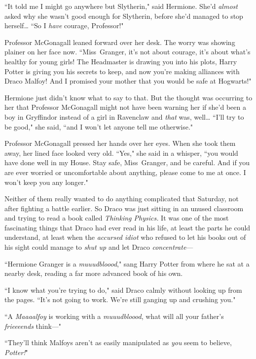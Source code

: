 ``It told me I might go anywhere but Slytherin," said Hermione. She'd \emph{almost} asked why she wasn't good enough for Slytherin, before she'd managed to stop herself{\ldots} ``So I \emph{have} courage, Professor!"

Professor McGonagall leaned forward over her desk. The worry was showing plainer on her face now. ``Miss~Granger, it's not about courage, it's about what's healthy for young girls! The Headmaster is drawing you into his plots, Harry Potter is giving you his secrets to keep, and now you're making alliances with Draco Malfoy! And I promised your mother that you would be safe at Hogwarts!"

Hermione just didn't know what to say to that. But the thought was occurring to her that Professor McGonagall might not have been warning her if she'd been a boy in Gryffindor instead of a girl in Ravenclaw and \emph{that} was, well{\ldots} ``I'll try to be good," she said, ``and I won't let anyone tell me otherwise."

Professor McGonagall pressed her hands over her eyes. When she took them away, her lined face looked very old. ``Yes," she said in a whisper, ``you would have done well in my House. Stay safe, Miss~Granger, and be careful. And if you are ever worried or uncomfortable about anything, please come to me at once. I won't keep you any longer."


Neither of them really wanted to do anything complicated that Saturday, not after fighting a battle earlier. So Draco was just sitting in an unused classroom and trying to read a book called \emph{Thinking Physics.} It was one of the most fascinating things that Draco had ever read in his life, at least the parts he could understand, at least when the \emph{accursed idiot} who refused to let his books out of his sight could manage to \emph{shut up} and let Draco \emph{concentrate}—

``Hermione Granger is a \emph{muuudbloood}," sang Harry Potter from where he sat at a nearby desk, reading a far more advanced book of his own.

``I know what you're trying to do," said Draco calmly without looking up from the pages. ``It's not going to work. We're still ganging up and crushing you."

``A \emph{Maaaalfoy} is working with a \emph{muuudbloood}, what will all your father's \emph{frieeeends} think—"

``They'll think Malfoys aren't as easily manipulated as \emph{you} seem to believe, \emph{Potter!}"

